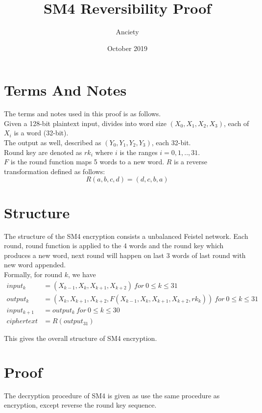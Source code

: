 \documentclass{article}
\title{SM4 Reversibility Proof}
\author{Anciety}
\date{October 2019}
\begin{document}
\maketitle

\section{Terms And Notes}

The terms and notes used in this proof is as follows.\\
Given a 128-bit plaintext input, divides into word size $(X_0, X_1, X_2, X_3)$, each of $X_i$ is a word (32-bit).\\
The output as well, described as $(Y_0, Y_1, Y_2, Y_3)$, each 32-bit.\\
Round key are denoted as $rk_i$ where $i$ is the ranges $i = 0, 1, .., 31$.\\
$F$ is the round function maps 5 words to a new word. $R$ is a reverse transformation defined as follows:\\
\begin{equation}
    R(a, b, c, d) = (d, c, b, a)
\end{equation}

\section{Structure}

The structure of the SM4 encryption consists a unbalanced Feistel network. Each round, round function is applied to the 4 words and the round key which produces a new word, next round will happen on last 3 words of last round with new word appended.\\
Formally, for round $k$, we have\\
\begin{equation}
\begin{aligned}
    input_k &= (X_{k-1}, X_k, X_{k+1}, X_{k+2})\ for\ 0\leq k \leq 31\\
    output_k &= (X_k, X_{k + 1}, X_{k + 2}, F(X_{k-1}, X_k, X_{k + 1}, X_{k + 2}, rk_{k}))\ for\ 0\leq k \leq 31\\
    input_{k+1} &= output_k\ for\ 0\leq k \leq 30\\
    ciphertext &= R(output_{31})
\end{aligned}
\end{equation}

This gives the overall structure of SM4 encryption.

\section{Proof}
The decryption procedure of SM4 is given as use the same procedure as encryption, except reverse the round key sequence.
\end{document}
